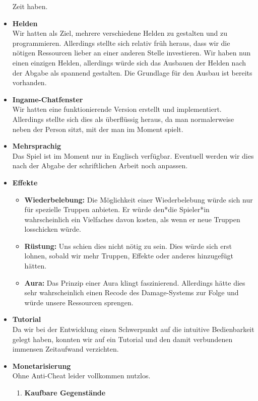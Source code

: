 \begin{itemize}
        Zeit haben.
    \item \textbf{Helden} \\
        Wir hatten als Ziel, mehrere verschiedene Helden zu gestalten und zu programmieren. Allerdings stellte sich relativ früh heraus, dass wir die nötigen Ressourcen
        lieber an einer anderen Stelle investieren. Wir haben nun einen einzigen Helden, allerdings würde sich das Ausbauen der Helden nach der Abgabe als spannend gestalten.
        Die Grundlage für den Ausbau ist bereits vorhanden.
    \item \textbf{Ingame-Chatfenster}\\
        Wir hatten eine funktionierende Version erstellt und implementiert. Allerdings stellte sich dies als überflüssig heraus, da man normalerweise neben der Person sitzt,
        mit der man im Moment spielt.
    \item \textbf{Mehrsprachig} \\
        Das Spiel ist im Moment nur in Englisch verfügbar. Eventuell werden wir dies nach der Abgabe der schriftlichen Arbeit noch anpassen.
    \item \textbf{Effekte}
    \begin{itemize}
        \item \textbf{Wiederbelebung:}
            Die Möglichkeit einer Wiederbelebung würde sich nur für spezielle Truppen anbieten. Er würde den*die Spieler*in wahrscheinlich ein Vielfaches davon kosten,
            als wenn er neue Truppen losschicken würde. 
        \item \textbf{Rüstung:}
            Uns schien dies nicht nötig zu sein. Dies würde sich erst lohnen, sobald wir mehr Truppen, Effekte oder anderes hinzugefügt hätten.
        \item \textbf{Aura:}
            Das Prinzip einer Aura klingt faszinierend. Allerdings hätte dies sehr wahrscheinlich einen Recode des Damage-Systems zur Folge und würde unsere Ressourcen sprengen.
    \end{itemize}
    \item \textbf{Tutorial} \\
        Da wir bei der Entwicklung einen Schwerpunkt auf die intuitive Bedienbarkeit gelegt haben, konnten wir auf ein Tutorial und den damit verbundenen immensen Zeitaufwand verzichten.
    \item \textbf{Monetarisierung} \\
    Ohne Anti-Cheat leider vollkommen nutzlos.
    \begin{enumerate}
        \item \textbf{Kaufbare Gegenstände}

\end{enumerate}
\end{itemize}
